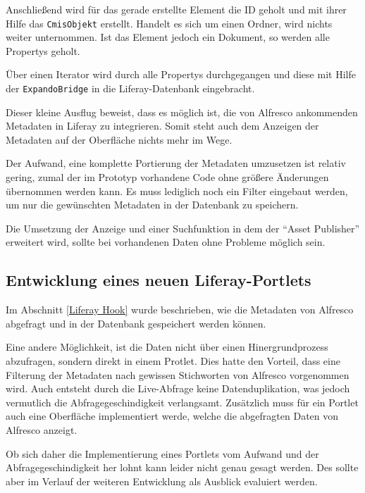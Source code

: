 Anschlie\ss{}end wird f\"ur das gerade erstellte Element die ID geholt und mit ihrer Hilfe das \texttt{CmisObjekt} erstellt.
Handelt es sich um einen Ordner, wird nichts weiter unternommen. Ist das Element jedoch ein Dokument, so werden alle Propertys geholt.

\"Uber einen Iterator wird durch alle Propertys durchgegangen und diese mit Hilfe der \texttt{ExpandoBridge} in die Liferay-Datenbank eingebracht.



Dieser kleine Ausflug beweist, dass es m\"oglich ist, die von Alfresco ankommenden Metadaten in Liferay zu integrieren. Somit steht auch dem Anzeigen der Metadaten auf der Oberfl\"ache nichts mehr im Wege. \cite{Chemistry_examples}

Der Aufwand, eine komplette Portierung der Metadaten umzusetzen ist relativ gering, zumal der im Prototyp vorhandene Code ohne gr\"o\ss{}ere \"Anderungen \"ubernommen werden kann. Es muss lediglich noch ein Filter eingebaut werden, um nur die gew\"unschten Metadaten in der Datenbank zu speichern.

Die Umsetzung der Anzeige und einer Suchfunktion in dem der "`Asset Publisher"' erweitert wird, sollte bei vorhandenen Daten ohne Probleme m\"oglich sein.

\subsection{Entwicklung eines neuen Liferay-Portlets}\label{Liferay Portlet}
Im Abschnitt \ref{Liferay Hook} wurde beschrieben, wie die Metadaten von Alfresco abgefragt und in der Datenbank gespeichert werden k\"onnen.

Eine andere  M\"oglichkeit, ist die Daten nicht \"uber einen Hinergrundprozess abzufragen, sondern direkt in einem Protlet. Dies hatte den Vorteil, dass eine Filterung der Metadaten nach gewissen Stichworten von Alfresco vorgenommen wird. Auch entsteht durch die Live-Abfrage keine Datenduplikation, was jedoch vermutlich die Abfragegeschindigkeit verlangsamt.
Zus\"atzlich muss f\"ur ein Portlet auch eine Oberfl\"ache implementiert werde, welche die abgefragten Daten von Alfresco anzeigt.

Ob sich daher die Implementierung eines Portlets vom Aufwand und der Abfragegeschindigkeit her lohnt kann leider nicht genau gesagt werden. Des sollte aber im Verlauf der weiteren Entwicklung als Ausblick evaluiert werden.

